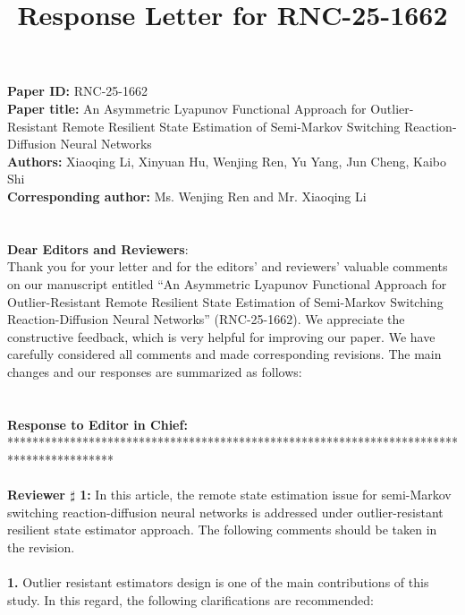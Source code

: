 \documentclass[14pt,fleqn]{article}
\date{}
\begin{document}

\title{\bf Response Letter for RNC-25-1662}
\author{}
\date{}
\maketitle
\noindent \textbf{Paper ID:} RNC-25-1662 \\
\textbf{Paper title:} An Asymmetric Lyapunov Functional Approach for Outlier-Resistant Remote Resilient State Estimation of Semi-Markov Switching Reaction-Diffusion Neural Networks\\
\textbf{Authors:} Xiaoqing Li, Xinyuan Hu, Wenjing Ren, Yu Yang, Jun Cheng, Kaibo Shi \\
\textbf{Corresponding author:} Ms. Wenjing Ren and Mr. Xiaoqing Li
\\
\\
\\
\noindent \textbf{Dear Editors and Reviewers}: \\
\indent Thank you for your letter and for the editors’ and reviewers’ valuable comments on our manuscript entitled
“An Asymmetric Lyapunov Functional Approach for Outlier-Resistant Remote Resilient State Estimation of Semi-Markov Switching Reaction-Diffusion Neural Networks” (RNC-25-1662). We appreciate the constructive feedback, which is very helpful for improving our paper. We have carefully considered all comments and made corresponding revisions. The main changes and our responses are summarized as follows:
\\
~\\
\\
\textbf{Response to  Editor in Chief:}\\[10pt]
*****************************************************************************************\\
\\
\hspace*{-0.5cm}\indent\textbf{Reviewer $\sharp$ 1:} In this article, the remote state estimation issue for semi-Markov switching reaction-diffusion neural networks is addressed under outlier-resistant resilient state estimator approach. The following comments should be taken in the revision.
\\
~\\
\textbf{1.}  Outlier resistant estimators design is one of the main contributions of this study. In this regard, the following clarifications are recommended:\\
\end{document}
